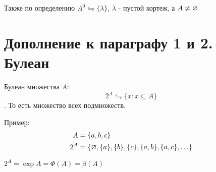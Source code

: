 Также по определению $A^{0} \leftrightharpoons \{\lambda\} $, $\lambda$ - пустой кортеж,
а  $A \neq  \varnothing$

\section{Дополнение к параграфу 1 и 2. Булеан}
\begin{definition}
Булеан множества $A$:  \[
2^{A} \leftrightharpoons \{x:x \subseteq A\} 
\].
То есть множество всех подмножеств.
\end{definition}

Пример:
\begin{align*}
	A &= \{a,b,c\} \\
	2^{A} &= \{\varnothing, \{a\}, \{b\}, \{c\}, \{a,b\}, \{a,c\},\ldots     \} 
\end{align*}

\medskip

$2^{A} = \exp A=\Phi(A)=\beta(A)$


